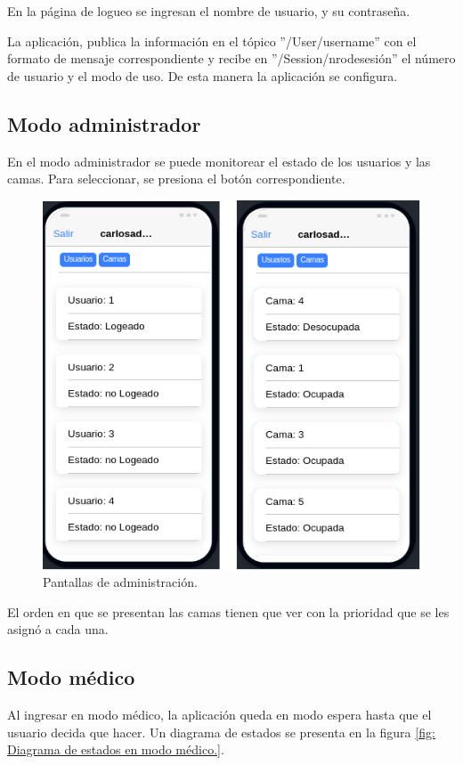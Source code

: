En la página de logueo se ingresan el nombre de usuario, y su contraseña.

La aplicación, publica la información en el tópico ''/User/username'' con el formato de mensaje correspondiente y recibe en ''/Session/nrodesesión'' el número de usuario y el modo de uso. De esta manera la aplicación se configura.


\subsection{Modo administrador}
En el modo administrador se puede monitorear el estado de los usuarios y las camas. Para seleccionar, se presiona el botón correspondiente.

\begin{figure}[ht]
	\centering
	\includegraphics[scale=.70]{./Figures/app/administracion.png}
	\caption{ Pantallas de administración.}
	\label{fig: Pantallas de administración.}
\end{figure} 

El orden en que se presentan las camas tienen que ver con la prioridad que se les asignó a cada una.



\pagebreak
\subsection{Modo médico}
Al ingresar en modo médico, la aplicación queda en modo espera hasta que el usuario decida que hacer. Un diagrama de estados se presenta en la figura \ref{fig: Diagrama de estados en modo médico.}. 

